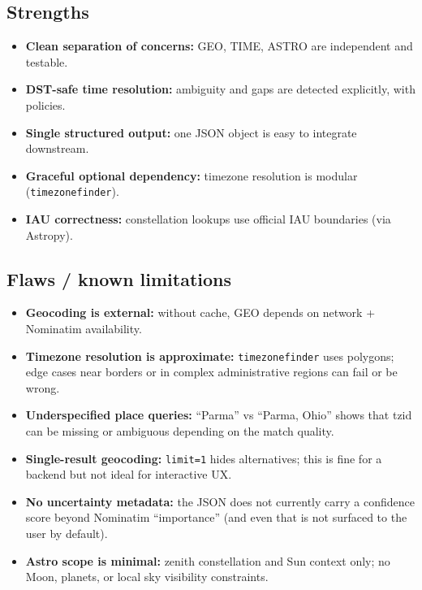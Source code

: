 \documentclass[11pt,a4paper]{article}
\begin{document}
\subsection{Strengths}
\begin{itemize}
  \item \textbf{Clean separation of concerns:} GEO, TIME, ASTRO are independent and testable.
  \item \textbf{DST-safe time resolution:} ambiguity and gaps are detected explicitly, with policies.
  \item \textbf{Single structured output:} one JSON object is easy to integrate downstream.
  \item \textbf{Graceful optional dependency:} timezone resolution is modular (\texttt{timezonefinder}).
  \item \textbf{IAU correctness:} constellation lookups use official IAU boundaries (via Astropy).
\end{itemize}

\subsection{Flaws / known limitations}
\begin{itemize}
  \item \textbf{Geocoding is external:} without cache, GEO depends on network + Nominatim availability.
  \item \textbf{Timezone resolution is approximate:} \texttt{timezonefinder} uses polygons; edge cases near borders
        or in complex administrative regions can fail or be wrong.
  \item \textbf{Underspecified place queries:} ``Parma'' vs ``Parma, Ohio'' shows that tzid can be missing or
        ambiguous depending on the match quality.
  \item \textbf{Single-result geocoding:} \texttt{limit=1} hides alternatives; this is fine for a backend but not ideal
        for interactive UX.
  \item \textbf{No uncertainty metadata:} the JSON does not currently carry a confidence score beyond Nominatim
        ``importance'' (and even that is not surfaced to the user by default).
  \item \textbf{Astro scope is minimal:} zenith constellation and Sun context only; no Moon, planets, or
        local sky visibility constraints.
\end{itemize}
\end{document}

